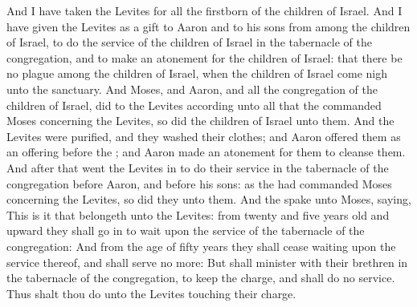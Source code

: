 \begin{biblechapter}
\verse And I have taken the Levites for all the firstborn of the children of Israel.
\verse And I have given the Levites as a gift to Aaron and to his sons from among the children of Israel, to do the service of the children of Israel in the tabernacle of the congregation, and to make an atonement for the children of Israel: that there be no plague among the children of Israel, when the children of Israel come nigh unto the sanctuary.
\verse And Moses, and Aaron, and all the congregation of the children of Israel, did to the Levites according unto all that the \LORD commanded Moses concerning the Levites, so did the children of Israel unto them.
\verse And the Levites were purified, and they washed their clothes; and Aaron offered them as an offering before the \LORD; and Aaron made an atonement for them to cleanse them.
\verse And after that went the Levites in to do their service in the tabernacle of the congregation before Aaron, and before his sons: as the \LORD had commanded Moses concerning the Levites, so did they unto them.
\verse And the \LORD spake unto Moses, saying,
\verse This is it that belongeth unto the Levites: from twenty and five years old and upward they shall go in to wait upon the service of the tabernacle of the congregation:
\verse And from the age of fifty years they shall cease waiting upon the service thereof, and shall serve no more:
\verse But shall minister with their brethren in the tabernacle of the congregation, to keep the charge, and shall do no service. Thus shalt thou do unto the Levites touching their charge.
\end{biblechapter}

